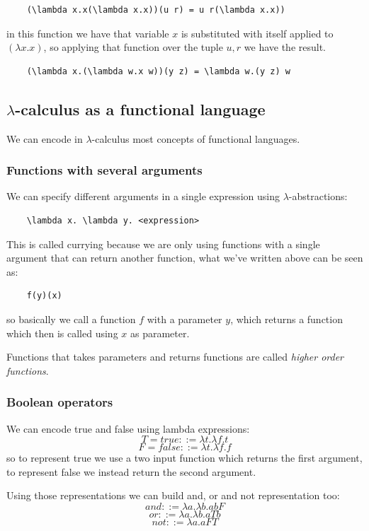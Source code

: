 \begin{verbatim}
    (\lambda x.x(\lambda x.x))(u r) = u r(\lambda x.x))
\end{verbatim}
in this function we have that variable $x$ is substituted with itself applied to $(\lambda x.x)$, so applying that function over the tuple $u,r$ we have the result.

\begin{verbatim}
    (\lambda x.(\lambda w.x w))(y z) = \lambda w.(y z) w
\end{verbatim}

\subsection{$\lambda$-calculus as a functional language}
We can encode in $\lambda$-calculus most concepts of functional languages.

\subsubsection{Functions with several arguments}
We can specify different arguments in a single expression using $\lambda$-abstractions:
\begin{verbatim}
    \lambda x. \lambda y. <expression>
\end{verbatim}
This is called currying because we are only using functions with a single argument that can return another function, what we've written above can be seen as:
\begin{verbatim}
    f(y)(x)
\end{verbatim}
so basically we call a function $f$ with a parameter $y$, which returns a function which then is called using $x$ as parameter.

Functions that takes parameters and returns functions are called \emph{higher order functions}.

\subsubsection{Boolean operators}
We can encode true and false using lambda expressions:
$$
    T = true ::= \lambda t.\lambda f.t
$$
$$
    F = false ::= \lambda t. \lambda f.f
$$
so to represent true we use a two input function which returns the first argument, to represent false we instead return the second argument.

Using those representations we can build and, or and not representation too:
$$
    and ::= \lambda a. \lambda b. a b F
$$
$$
    or ::= \lambda a. \lambda b . a T b 
$$
$$
    not ::= \lambda a. a F T
$$

